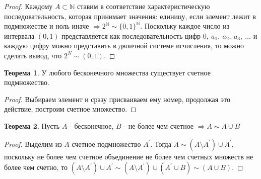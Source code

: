 \documentclass[a4paper, 12pt]{article}
\newcommand{\N}{\mathbb{N}}
\theoremstyle{definition}
\newtheorem*{theorem}{Теорема}
\begin{document}
        \begin{proof}
            Каждому $A\subset \N$ ставим в соответствие характеристическую последовательность, которая принимает значения: единицу, если элемент лежит в подмножестве и ноль иначе $\Rightarrow 2^{\N}\sim \{0,1\}^{\N}$. Поскольку каждое число из интервала $(0,1)$ представляется как последовательность цифр $0,\ a_1,\ a_2,\ a_3,\ \dots$ и каждую цифру можно представить в двоичной системе исчисления, то можно сделать вывод, что $2^{N}\sim (0,1)$.
        \end{proof}
        \begin{theorem}
            У любого бесконечного множества существует счетное подмножество.
        \end{theorem} 
        \begin{proof}
            Выбираем элемент и сразу присваиваем ему номер, продолжая это действие, построим счетное множество.
        \end{proof}
        \begin{theorem}
            Пусть $A$ - бесконечное, $B$ - не более чем счетное $\Rightarrow A\sim A\cup B$
        \end{theorem} 
        \begin{proof}
            Выделим из $A$ счетное подмножество $A^{\prime}$. Тогда $A\sim (A\setminus A^{\prime})\cup A^{\prime}$, поскольку не более чем счетное объединение не более чем счетных множеств не более чем счетно, то  $(A\setminus A^{\prime})\cup A^{\prime} \sim (A\setminus A^{\prime})\cup(A^{\prime}\cup B) \sim(A\cup B)$.
        \end{proof}
\end{document}
